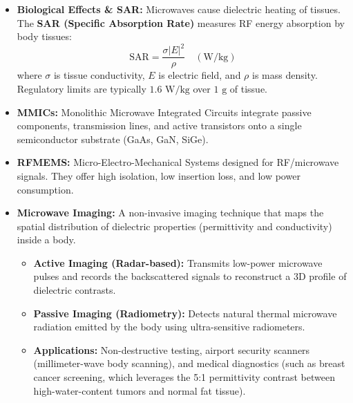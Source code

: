 \documentclass[12pt,a4paper]{article}
\begin{document}
\begin{itemize}[leftmargin=*, itemsep=3pt]
  \item \textbf{Biological Effects \& SAR:} Microwaves cause dielectric heating of tissues. The \textbf{SAR (Specific Absorption Rate)} measures RF energy absorption by body tissues:
    \begin{equation}
      \text{SAR} = \frac{\sigma |E|^2}{\rho} \quad (\text{W/kg})
    \end{equation}
    where $\sigma$ is tissue conductivity, $E$ is electric field, and $\rho$ is mass density. Regulatory limits are typically $1.6\text{ W/kg}$ over $1\text{ g}$ of tissue.
  \item \textbf{MMICs:} Monolithic Microwave Integrated Circuits integrate passive components, transmission lines, and active transistors onto a single semiconductor substrate (GaAs, GaN, SiGe).
  \item \textbf{RFMEMS:} Micro-Electro-Mechanical Systems designed for RF/microwave signals. They offer high isolation, low insertion loss, and low power consumption.
  \item \textbf{Microwave Imaging:} A non-invasive imaging technique that maps the spatial distribution of dielectric properties (permittivity and conductivity) inside a body.
  \begin{itemize}[leftmargin=*, itemsep=2.5pt, topsep=0pt]
    \item \textbf{Active Imaging (Radar-based):} Transmits low-power microwave pulses and records the backscattered signals to reconstruct a 3D profile of dielectric contrasts.
    \item \textbf{Passive Imaging (Radiometry):} Detects natural thermal microwave radiation emitted by the body using ultra-sensitive radiometers.
    \item \textbf{Applications:} Non-destructive testing, airport security scanners (millimeter-wave body scanning), and medical diagnostics (such as breast cancer screening, which leverages the 5:1 permittivity contrast between high-water-content tumors and normal fat tissue).
  \end{itemize}
\end{itemize}
\end{document}
